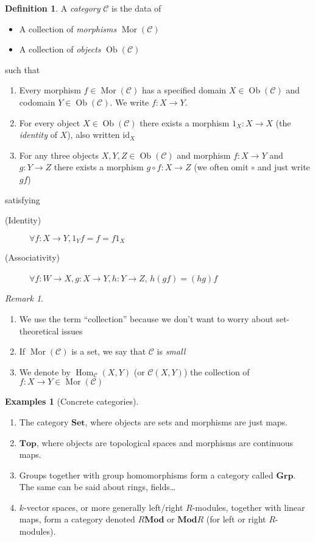 \documentclass{article}
\newcommand{\id}{\mathrm{id}}
\newcommand{\cat}{\mathcal{C}}
\newcommand{\Set}{\mathbf{Set}}
\newcommand{\Top}{\mathbf{Top}}
\newcommand{\Grp}{\mathbf{Grp}}
\newcommand{\Mod}{\mathbf{Mod}}
\DeclareMathOperator{\Ob}{Ob}
\DeclareMathOperator{\Mor}{Mor}
\DeclareMathOperator{\Hom}{Hom}
\theoremstyle{plain}
\theoremstyle{definition}
\newtheorem{definition}[theorem]{Definition}
\newtheorem{examples}[theorem]{Examples}
\theoremstyle{remark}
\newtheorem*{remark}{Remark}
\begin{document}
\begin{definition}
    A \emph{category} $\cat$ is the data of
    \begin{itemize}
        \item A collection of \emph{morphisms} $\Mor(\cat)$
        \item A collection of \emph{objects} $\Ob(\cat)$
    \end{itemize}
    such that
    \begin{enumerate}
        \item Every morphism $f \in \Mor(\cat)$ has a specified domain $X \in \Ob(\cat)$ and codomain $Y \in \Ob(\cat)$. We write $f : X \to Y$.
        \item For every object $X \in \Ob(\cat)$ there exists a morphism $1_X : X \to X$ (the \emph{identity} of $X$), also written $\id_X$
        \item For any three objects $X,Y,Z \in \Ob(\cat)$ and morphism $f : X \to Y$ and $g : Y \to Z$ there exists a morphism $g\circ f : X \to Z$ (we often omit $\circ$ and just write $gf$)
    \end{enumerate}
    satisfying
    \begin{description}
        \item[(Identity)] $\forall f : X \to Y, 1_Y f = f = f 1_X$
        \item[(Associativity)] $\forall f : W \to X, g : X \to Y, h : Y \to Z$, $h(gf) = (hg)f$
    \end{description}
\end{definition}

\begin{remark} \leavevmode
    \begin{enumerate}
        \item We use the term ``collection'' because we don't want to worry about set-theoretical issues
        \item If $\Mor(\cat)$ is a set, we say that $\cat$ is \emph{small}
        \item We denote by $\Hom_\cat (X,Y)$ (or $\cat(X,Y)$) the collection of $f : X \to Y \in \Mor(\cat)$
    \end{enumerate}
\end{remark}

\begin{examples}[Concrete categories] \leavevmode
    \begin{enumerate}
        \item The category $\Set$, where objects are sets and morphisms are just maps.
        \item $\Top$, where objects are topological spaces and morphisms are continuous maps.
        \item Groups together with group homomorphisms form a category called $\Grp$. The same can be said about rings, fields\dots
        \item $k$-vector spaces, or more generally left/right $R$-modules, together with linear maps, form a category denoted $R\Mod$ or $\Mod R$ (for left or right $R$-modules).
    \end{enumerate}
\end{examples}
\end{document}
